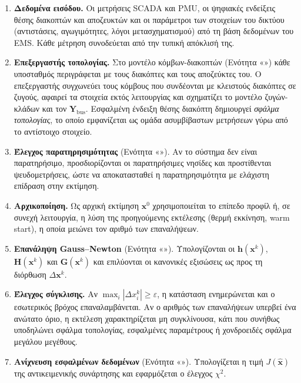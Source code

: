 \begin{enumerate}
\item \textbf{Δεδομένα εισόδου.} Οι μετρήσεις SCADA και PMU, οι ψηφιακές ενδείξεις
      θέσης διακοπτών και αποζευκτών και οι παράμετροι των στοιχείων του δικτύου (αντιστάσεις,
      αγωγιμότητες, λόγοι μετασχηματισμού) από τη βάση δεδομένων του EMS. Κάθε μέτρηση
      συνοδεύεται από την τυπική απόκλισή της.
\item \textbf{Επεξεργαστής τοπολογίας.} Στο μοντέλο κόμβων-διακοπτών (Ενότητα «»)
      κάθε υποσταθμός περιγράφεται με τους διακόπτες και τους αποζεύκτες του. Ο επεξεργαστής
      συγχωνεύει τους κόμβους που συνδέονται με κλειστούς διακόπτες σε ζυγούς, αφαιρεί τα
      στοιχεία εκτός λειτουργίας και σχηματίζει το μοντέλο ζυγών-κλάδων και τον
      $\mathbf{Y}_{\mathrm{bus}}$. Εσφαλμένη ένδειξη θέσης διακόπτη δημιουργεί \emph{σφάλμα
      τοπολογίας}, το οποίο εμφανίζεται ως ομάδα ασυμβίβαστων μετρήσεων γύρω από το
      αντίστοιχο στοιχείο.
\item \textbf{Έλεγχος παρατηρησιμότητας} (Ενότητα «»). Αν το σύστημα δεν είναι
      παρατηρήσιμο, προσδιορίζονται οι παρατηρήσιμες νησίδες και προστίθενται
      ψευδομετρήσεις, ώστε να αποκατασταθεί η παρατηρησιμότητα με ελάχιστη επίδραση στην
      εκτίμηση.
\item \textbf{Αρχικοποίηση.} Ως αρχική εκτίμηση $\mathbf{x}^{0}$ χρησιμοποιείται το επίπεδο
      προφίλ ή, σε συνεχή λειτουργία, η λύση της προηγούμενης εκτέλεσης (θερμή εκκίνηση,
      warm start), η οποία μειώνει τον αριθμό των επαναλήψεων.
\item \textbf{Επανάληψη Gauss--Newton} (Ενότητα «»). Υπολογίζονται οι
      $\mathbf{h}(\mathbf{x}^{k})$, $\mathbf{H}(\mathbf{x}^{k})$ και $\mathbf{G}(\mathbf{x}^{k})$ και
      επιλύονται οι κανονικές εξισώσεις ως προς τη διόρθωση $\Delta\mathbf{x}^{k}$.
\item \textbf{Έλεγχος σύγκλισης.} Αν $\max_i |\Delta x_i^{k}| \ge \varepsilon$, η κατάσταση
      ενημερώνεται και ο εσωτερικός βρόχος επαναλαμβάνεται. Αν ο αριθμός των επαναλήψεων
      υπερβεί ένα ανώτατο όριο, η εκτέλεση χαρακτηρίζεται μη συγκλίνουσα, κάτι που συνήθως
      υποδηλώνει σφάλμα τοπολογίας, εσφαλμένες παραμέτρους ή χονδροειδές σφάλμα μεγάλου
      μεγέθους.
\item \textbf{Ανίχνευση εσφαλμένων δεδομένων} (Ενότητα «»). Υπολογίζεται η τιμή
      $J(\hat{\mathbf{x}})$ της αντικειμενικής συνάρτησης και εφαρμόζεται ο έλεγχος
      $\chi^2$.

\end{enumerate}
